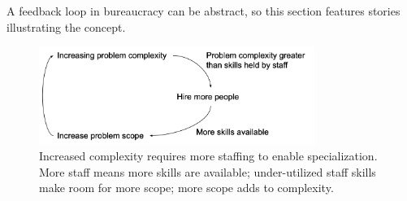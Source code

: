 A feedback loop in bureaucracy can be abstract, so this section features stories illustrating the concept.
\begin{center}
\begin{figure}[ht]
    \centering
    \includegraphics[width=0.8\textwidth]{images/feedback_loop_complexity_and_staffing}
    \caption{Increased complexity requires more staffing to enable specialization. More staff means more skills are available; under-utilized staff skills make room for more scope; more scope adds to complexity.}
    \label{fig:complexity_and_staff_growth}
\end{figure}
\end{center}


